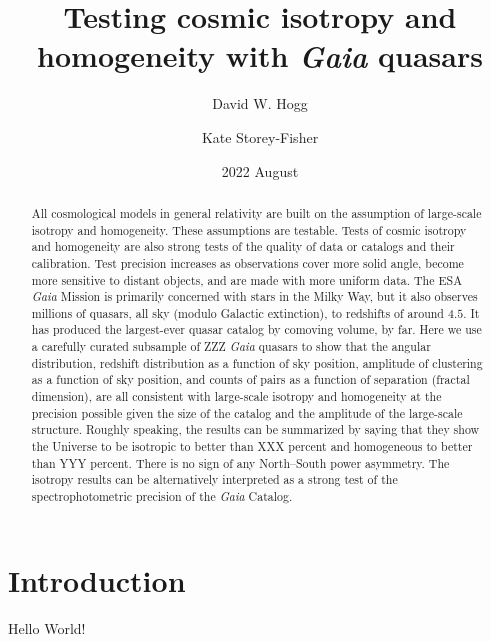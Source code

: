 \documentclass[modern]{aastex631}
\begin{document}
\title{%
Testing cosmic isotropy and homogeneity
with \textsl{Gaia} quasars}
\author{David W. Hogg}

\author{Kate Storey-Fisher}

\date{2022 August}

\begin{abstract}\noindent
All cosmological models in general relativity are built on the assumption of large-scale isotropy and homogeneity.
These assumptions are testable.
Tests of cosmic isotropy and homogeneity are also strong tests of the quality of data or catalogs and their calibration.
Test precision increases as observations cover more solid angle, become more sensitive to distant objects, and are made with more uniform data.
The ESA \textsl{Gaia} Mission is primarily concerned with stars in the Milky Way, but it also observes millions of quasars, all sky (modulo Galactic extinction), to redshifts of around $4.5$.
It has produced the largest-ever quasar catalog by comoving volume, by far.
Here we use a carefully curated subsample of ZZZ \textsl{Gaia} quasars to show that the angular distribution, redshift distribution as a function of sky position, amplitude of clustering as a function of sky position, and counts of pairs as a function of separation (fractal dimension), are all consistent with large-scale isotropy and homogeneity at the precision possible given the size of the catalog and the amplitude of the large-scale structure.
Roughly speaking, the results can be summarized by saying that they show the Universe to be isotropic to better than XXX percent and homogeneous to better than YYY percent.
There is no sign of any North--South power asymmetry.
The isotropy results can be alternatively interpreted as a strong test of the spectrophotometric precision of the \textsl{Gaia} Catalog.
\end{abstract}


\section{Introduction}

Hello World!
\end{document}
